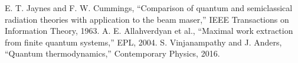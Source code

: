 \documentclass[a4paper,12pt]{article}
\begin{document}
\begin{thebibliography}{9}
 E. T. Jaynes and F. W. Cummings, ``Comparison of quantum and semiclassical radiation theories with application to the beam maser,'' IEEE Transactions on Information Theory, 1963.
 A. E. Allahverdyan et al., ``Maximal work extraction from finite quantum systems,'' EPL, 2004.
 S. Vinjanampathy and J. Anders, ``Quantum thermodynamics,'' Contemporary Physics, 2016.
\end{thebibliography}
\end{document}
